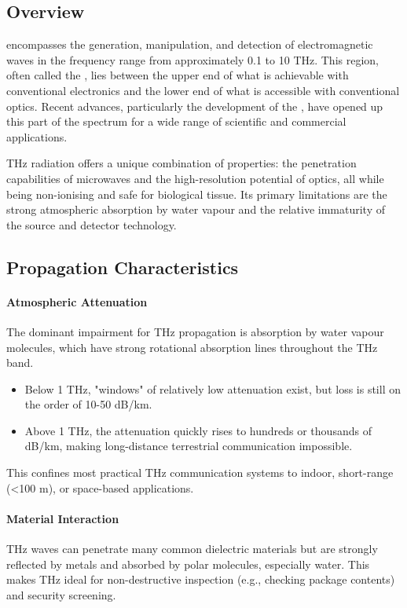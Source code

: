 \subsection{Overview}

 encompasses the generation, manipulation, and detection of electromagnetic waves in the frequency range from approximately 0.1 to 10 THz. This region, often called the , lies between the upper end of what is achievable with conventional electronics and the lower end of what is accessible with conventional optics. Recent advances, particularly the development of the , have opened up this part of the spectrum for a wide range of scientific and commercial applications.

\begin{keyconcept}
    THz radiation offers a unique combination of properties: the penetration capabilities of microwaves and the high-resolution potential of optics, all while being non-ionising and safe for biological tissue. Its primary limitations are the strong atmospheric absorption by water vapour and the relative immaturity of the source and detector technology.
\end{keyconcept}


\subsection{Propagation Characteristics}

\paragraph{Atmospheric Attenuation}
The dominant impairment for THz propagation is absorption by water vapour molecules, which have strong rotational absorption lines throughout the THz band.
\begin{itemize}
    \item Below 1 THz, "windows" of relatively low attenuation exist, but loss is still on the order of 10-50 dB/km.
    \item Above 1 THz, the attenuation quickly rises to hundreds or thousands of dB/km, making long-distance terrestrial communication impossible.
\end{itemize}
This confines most practical THz communication systems to indoor, short-range (<100 m), or space-based applications.

\paragraph{Material Interaction}
THz waves can penetrate many common dielectric materials but are strongly reflected by metals and absorbed by polar molecules, especially water. This makes THz ideal for non-destructive inspection (e.g., checking package contents) and security screening.


